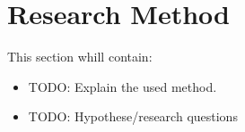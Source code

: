 \documentclass[../main.tex]{subfiles}
\begin{document}
    \section{Research Method}\label{sec:research_method}
    This section whill contain:
    \begin{itemize}
        \item TODO: Explain the used method. %
        \item TODO: Hypothese/research questions %
    \end{itemize}
\end{document}
